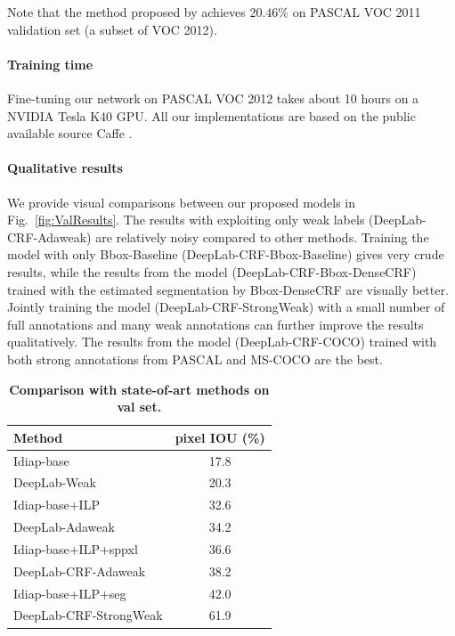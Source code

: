 Note that the method proposed by \citet{pathak2014fully} achieves $20.46\%$ on PASCAL VOC 2011 validation set (a subset of VOC 2012).

\paragraph{Training time} Fine-tuning our network on PASCAL VOC 2012 takes about 10
hours on a NVIDIA Tesla K40 GPU. All our implementations are based on the public available source Caffe \citep{jia2014caffe}.

\paragraph{Qualitative results} We provide visual comparisons between our proposed models in Fig.~\ref{fig:ValResults}. The results with exploiting only weak labels (DeepLab-CRF-Adaweak) are relatively noisy compared to other methods. Training the model with only Bbox-Baseline (DeepLab-CRF-Bbox-Baseline) gives very crude results, while the results from the model (DeepLab-CRF-Bbox-DenseCRF) trained with the estimated segmentation by Bbox-DenseCRF are visually better. Jointly training the model (DeepLab-CRF-StrongWeak) with a small number of full annotations and many weak annotations can further improve the results qualitatively. The results from the model (DeepLab-CRF-COCO) trained with both strong annotations from PASCAL and MS-COCO are the best.

\begin{table}
  \centering
  \caption{{\bf Comparison with state-of-art methods on val set.}}
  \begin{tabular}{l|c}
    {\bf Method} & pixel IOU (\%) \\
    \hline \hline
    Idiap-base   & 17.8 \\
    DeepLab-Weak & 20.3 \\
    \hline \hline
    Idiap-base+ILP  & 32.6 \\
    DeepLab-Adaweak & 34.2 \\
    \hline \hline
    Idiap-base+ILP+sppxl & 36.6 \\
    DeepLab-CRF-Adaweak  & 38.2 \\
    \hline \hline
    Idiap-base+ILP+seg       & 42.0 \\
    DeepLab-CRF-StrongWeak   & 61.9 \\
  \end{tabular}
  \label{tab:weak_state_of_art_val}
\end{table}

